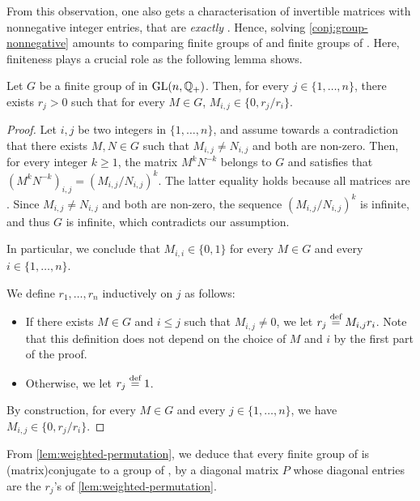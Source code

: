 From this observation, one also gets a characterisation of invertible matrices
with nonnegative integer entries, that are \emph{exactly} .
Hence, solving \cref{conj:group-nonnegative} amounts to comparing finite groups
of  and finite groups of .
Here, finiteness plays a crucial role as the following lemma shows.

\begin{lemma}
  \label{lem:weighted-permutation}
  Let $G$ be a finite group of  in
  $\GL[n]{\Rat_+}$. Then, for every $j \in \{1, \ldots, n\}$, 
  there exists $r_j > 0$ such that
  for every $M \in G$, 
  $M_{i,j} \in \{0, r_j / r_i\}$.
\end{lemma}
\begin{proof}
  Let $i, j$ be two integers in $\{1, \ldots, n\}$, and assume towards a
  contradiction that there exists $M, N \in G$ such that $M_{i,j} \neq N_{i,j}$
  and both are non-zero. Then, for every integer $k \geq 1$, the matrix $M^k
  N^{-k}$ belongs to $G$ and satisfies that $(M^k N^{-k})_{i,j} =
  (M_{i,j}/N_{i,j})^k$. The latter equality holds because all matrices are
  . Since $M_{i,j} \neq N_{i,j}$ and both are
  non-zero, the sequence $(M_{i,j}/N_{i,j})^k$ is infinite, and thus $G$ is
  infinite, which contradicts our assumption.

  In particular, we conclude that $M_{i,i} \in \{0, 1\}$ for every $M \in G$
  and every $i \in \{1, \ldots, n\}$.

  We define $r_1, \ldots, r_n$ inductively on $j$ as follows:
  \begin{itemize}
    \item If there exists $M \in G$ and $i \leq j$ such that $M_{i,j} \neq 0$,
      we let $r_j \defined M_{i,j} r_i$. Note that this definition does not depend on
      the choice of $M$ and $i$ by the first part of the proof.
    \item Otherwise, we let $r_j \defined 1$.
  \end{itemize}
  By construction, for every $M \in G$ and every $j \in \{1, \ldots, n\}$,
  we have $M_{i,j} \in \{0, r_j / r_i\}$.
\end{proof}

From \cref{lem:weighted-permutation}, we deduce that every finite group of
 is \kl(matrix){conjugate} to a group of
, by a diagonal matrix $P$ whose diagonal entries are the
$r_j$'s of \cref{lem:weighted-permutation}. 

